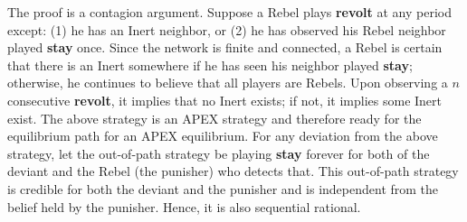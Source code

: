 \documentclass[12pt,letter]{article}
\theoremstyle{definition}
\theoremstyle{remark}
\theoremstyle{claim}
\begin{document}
%
%
%
%
The proof is a contagion argument. Suppose a Rebel plays \textbf{revolt} at any period except: (1) he has an Inert neighbor, or (2) he has observed his Rebel neighbor played \textbf{stay} once. Since the network is finite and connected, a Rebel is certain that there is an Inert somewhere if he has seen his neighbor played \textbf{stay}; otherwise, he continues to believe that all players are Rebels. Upon observing a $n$ consecutive \textbf{revolt}, it implies that no Inert exists; if not, it implies some Inert exist. The above strategy is an APEX strategy and therefore ready for the equilibrium path for an APEX equilibrium. For any deviation from the above strategy, let the out-of-path strategy be playing \textbf{stay} forever for both of the deviant and the Rebel (the punisher) who detects that. This out-of-path strategy is credible for both the deviant and the punisher and is independent from the belief held by the punisher. Hence, it is also sequential rational.
\end{document}
